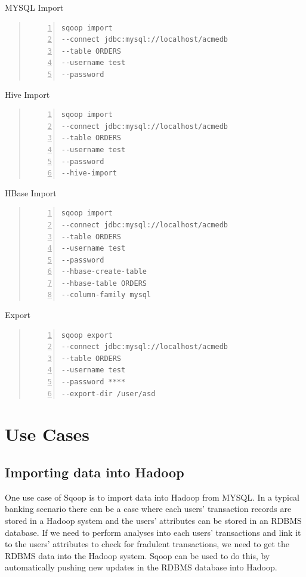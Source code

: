\documentclass[9pt,twocolumn,twoside]{styles/osajnl}
\begin{document}
\begin{algorithm}
\caption{MYSQL Import}\label{alg:mysql}
\begin{quote}
\begin{Verbatim}[numbers=left]
sqoop import 
--connect jdbc:mysql://localhost/acmedb 
--table ORDERS 
--username test 
--password 
\end{Verbatim}
\end{quote}
\end{algorithm}
\begin{algorithm}
\caption{Hive Import}\label{alg:hive}
\begin{quote}
\begin{Verbatim}[numbers=left]
sqoop import 
--connect jdbc:mysql://localhost/acmedb 
--table ORDERS 
--username test 
--password
--hive-import
\end{Verbatim}
\end{quote}
\end{algorithm}
\begin{algorithm}
\caption{HBase Import}\label{alg:hbase}
\begin{quote}
\begin{Verbatim}[numbers=left]
sqoop import 
--connect jdbc:mysql://localhost/acmedb
--table ORDERS 
--username test 
--password 
--hbase-create-table 
--hbase-table ORDERS 
--column-family mysql
\end{Verbatim}
\end{quote}
\end{algorithm}

\begin{algorithm}
\caption{Export}\label{alg:export}
\begin{quote}
\begin{Verbatim}[numbers=left]
sqoop export
--connect jdbc:mysql://localhost/acmedb
--table ORDERS 
--username test 
--password **** 
--export-dir /user/asd
\end{Verbatim}
\end{quote}
\end{algorithm}

\section{Use Cases}
\subsection{Importing data into Hadoop}
One use case of Sqoop is to import data into Hadoop from MYSQL. In a typical banking scenario there can be a case where each users' transaction records are stored in a Hadoop system and the users' attributes can be stored in an RDBMS database. If we need to perform analyses into each users' transactions and link it to the users' attributes to check for fradulent transactions, we need to get the RDBMS data into the Hadoop system. Sqoop can be used to do this, by automatically pushing new updates in the RDBMS database into Hadoop. 
\end{document}
